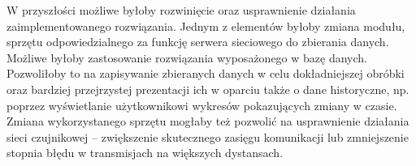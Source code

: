 W przyszłości możliwe byłoby rozwinięcie oraz usprawnienie działania zaimplementowanego rozwiązania. Jednym z elementów
byłoby zmiana modułu, sprzętu odpowiedzialnego za funkcję serwera sieciowego do zbierania danych. Możliwe byłoby
zastosowanie rozwiązania wyposażonego w bazę danych. Pozwoliłoby to na zapisywanie zbieranych danych w celu
dokładniejszej obróbki oraz bardziej przejrzystej prezentacji ich w oparciu także o dane historyczne, np. poprzez
wyświetlanie użytkownikowi wykresów pokazujących zmiany w czasie. Zmiana wykorzystanego sprzętu mogłaby też pozwolić na
usprawnienie działania sieci czujnikowej -- zwiększenie skutecznego zasięgu komunikacji lub zmniejszenie stopnia błędu w
transmisjach na większych dystansach.